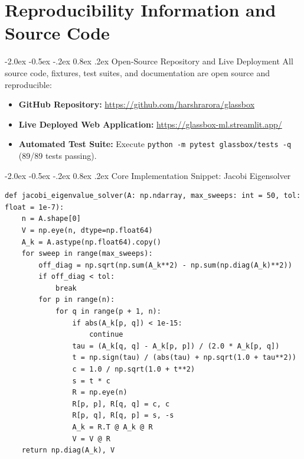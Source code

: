 \documentclass[12pt,a4paper]{report}
\makeatletter
\newenvironment{tightitemize}{%
  \begin{itemize}%
    \setlength{\itemsep}{1.5pt}%
    \setlength{\parskip}{0pt}%
    \setlength{\parsep}{0pt}%
}{%
  \end{itemize}%
}
\renewcommand\section{\@startsection {section}{1}{\z@}%
                                   {-2.0ex \@plus -0.5ex \@minus -.2ex}%
                                   {0.8ex \@plus.2ex}%
                                   {\normalfont\fontsize{14}{17}\bfseries\color{headerblue}}}
\makeatother
\begin{document}
\appendix
\chapter{Reproducibility Information and Source Code}

\section{Open-Source Repository and Live Deployment}
All source code, fixtures, test suites, and documentation are open source and reproducible:
\begin{tightitemize}
    \item \textbf{GitHub Repository:} \url{https://github.com/harshrarora/glassbox}
    \item \textbf{Live Deployed Web Application:} \url{https://glassbox-ml.streamlit.app/}
    \item \textbf{Automated Test Suite:} Execute \texttt{python -m pytest glassbox/tests -q} (89/89 tests passing).
\end{tightitemize}

\section{Core Implementation Snippet: Jacobi Eigensolver}
\begin{verbatim}
def jacobi_eigenvalue_solver(A: np.ndarray, max_sweeps: int = 50, tol: float = 1e-7):
    n = A.shape[0]
    V = np.eye(n, dtype=np.float64)
    A_k = A.astype(np.float64).copy()
    for sweep in range(max_sweeps):
        off_diag = np.sqrt(np.sum(A_k**2) - np.sum(np.diag(A_k)**2))
        if off_diag < tol:
            break
        for p in range(n):
            for q in range(p + 1, n):
                if abs(A_k[p, q]) < 1e-15:
                    continue
                tau = (A_k[q, q] - A_k[p, p]) / (2.0 * A_k[p, q])
                t = np.sign(tau) / (abs(tau) + np.sqrt(1.0 + tau**2))
                c = 1.0 / np.sqrt(1.0 + t**2)
                s = t * c
                R = np.eye(n)
                R[p, p], R[q, q] = c, c
                R[p, q], R[q, p] = s, -s
                A_k = R.T @ A_k @ R
                V = V @ R
    return np.diag(A_k), V
\end{verbatim}
\end{document}
